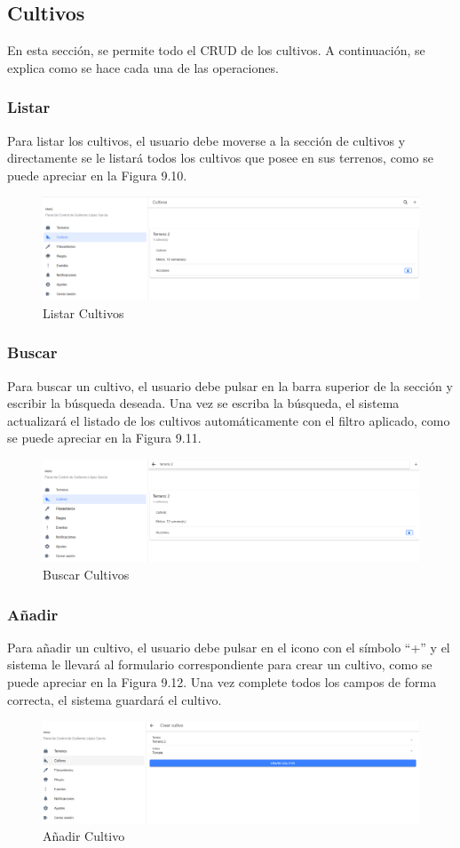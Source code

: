 \subsection{Cultivos}
En esta sección, se permite todo el CRUD de los cultivos. A continuación, se explica como se hace cada una de las operaciones.

\subsubsection{Listar}
Para listar los cultivos, el usuario debe moverse a la sección de cultivos y directamente se le listará todos los cultivos que posee en sus terrenos, como se puede apreciar en la Figura 9.10.
\begin{figure}[H]
    \centering
    \includegraphics[width=0.7\linewidth]{images/user-manual/crop/list.png}
    \caption{Listar Cultivos}
\end{figure}

\subsubsection{Buscar}
Para buscar un cultivo, el usuario debe pulsar en la barra superior de la sección y escribir la búsqueda deseada. Una vez se escriba la búsqueda, el sistema actualizará el listado de los cultivos automáticamente con el filtro aplicado, como se puede apreciar en la Figura 9.11.
\begin{figure}[H]
    \centering
    \includegraphics[width=0.7\linewidth]{images/user-manual/crop/search.png}
    \caption{Buscar Cultivos}
\end{figure}

\subsubsection{Añadir}
Para añadir un cultivo, el usuario debe pulsar en el icono con el símbolo ``+'' y el sistema le llevará al formulario correspondiente para crear un cultivo, como se puede apreciar en la Figura 9.12. Una vez complete todos los campos de forma correcta, el sistema guardará el cultivo.
\begin{figure}[H]
    \centering
    \includegraphics[width=0.7\linewidth]{images/user-manual/crop/create.png}
    \caption{Añadir Cultivo}
\end{figure}

